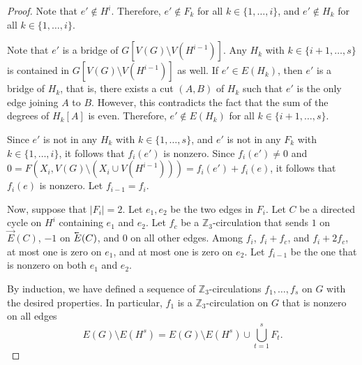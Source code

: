 \begin{proof}
	Note that \(e' \notin H^{i}\).
	Therefore, \(e' \notin F_k\) for all \(k \in \{1, \dots, i\}\), and \(e' \notin H_k\) for all \(k \in \{1, \dots, i\}\).

	Note that \(e'\) is a bridge of \(G[V(G) \setminus V(H^{i-1})]\).
	Any \(H_k\) with \(k \in \{i+1, \dots, s\}\) is contained in \(G[V(G) \setminus V(H^{i-1})]\) as well.
	If \(e' \in E(H_k)\), then \(e'\) is a bridge of \(H_k\), that is, there exists a cut \((A, B)\) of \(H_k\) such that \(e'\) is the only edge joining \(A\) to \(B\).
	However, this contradicts the fact that the sum of the degrees of \(H_k[A]\) is even.
	Therefore, \(e' \notin E(H_k)\) for all \(k \in \{i+1, \dots, s\}\).

	Since \(e'\) is not in any \(H_k\) with \(k \in \{1, \dots, s\}\),
	and \(e'\) is not in any \(F_k\) with \(k \in \{1, \dots, i\}\),
	it follows that \(f_i(e')\) is nonzero.
	Since \(f_i(e') \neq 0\) and \(0 = F(X_i, V(G) \setminus (X_i \cup V(H^{i-1}))) = f_i(e') + f_i(e)\), it follows that \(f_i(e)\) is nonzero.
	Let \(f_{i-1} = f_i\).

	Now, suppose that \(|F_i| = 2\).
	Let \(e_1, e_2\) be the two edges in \(F_i\).
	Let \(C\) be a directed cycle on \(H^{i}\) containing \(e_1\) and \(e_2\).
	Let \(f_c\) be a \(\mathbb{Z}_3\)-circulation that sends \(1\) on \(\vec{E}(C)\), \(-1\) on \(\cev{E}(C)\), and \(0\) on all other edges.
	Among \(f_i\), \(f_i + f_c\), and \(f_i + 2 f_c\), at most one is zero on \(e_1\), and at most one is zero on \(e_2\).
	Let \(f_{i-1}\) be the one that is nonzero on both \(e_1\) and \(e_2\).

	By induction, we have defined a sequence of \(\mathbb{Z}_3\)-circulations \(f_1, \dots, f_s\) on \(G\) with the desired properties.
	In particular, \(f_1\) is a \(\mathbb{Z}_3\)-circulation on \(G\) that is nonzero on all edges 
	\begin{equation}
		E(G) \setminus E(H^{s}) = E(G) \setminus E(H^{s}) \cup \bigcup_{t = 1}^{s} F_t.
	\end{equation}
\end{proof}